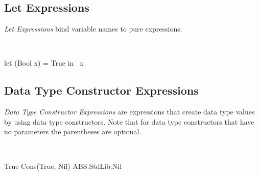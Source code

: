 \begin{abssyntax}
      {}
                {}
                {}
                {}
                {}
                {}
                {}
                {}
                {}
                {}
                \TRS{(}  \TRS{)}\\
     {}\\
  {}\ \ \\
      {}\\
  {}\ 
\end{abssyntax}


\subsection{Let Expressions}
\emph{Let Expressions} bind variable names to pure expressions.

\begin{abssyntax}
  {}\ \TRS{(}  \TRS{)}\ \TRS{=}\ \ \ 
\end{abssyntax}

\begin{absexample}
let (Bool x) = True in ~x  
\end{absexample}

\subsection{Data Type Constructor Expressions}
\emph{Data Type Constructor Expressions} are expressions that create data type values by using data type constructors.
Note that for data type constructors that have no parameters the parentheses are optional.

\begin{abssyntax}
  {}
                    {}\ \TRS{(}  \TRS{)}
\end{abssyntax}

\begin{absexample}
True
Cons(True, Nil)  
ABS.StdLib.Nil
\end{absexample}

